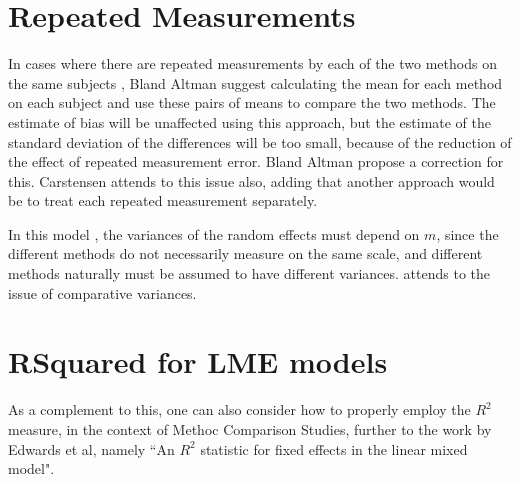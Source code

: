 \documentclass[12pt, a4paper]{report}
\theoremstyle{plain}
\theoremstyle{definition}
\theoremstyle{remark}
\begin{document}
	\section{Repeated Measurements}
	
	In cases where there are repeated measurements by each of the two
	methods on the same subjects , Bland Altman suggest calculating
	the mean for each method on each subject and use these pairs of
	means to compare the two methods.
	The estimate of bias will be unaffected using this approach, but
	the estimate of the standard deviation of the differences will be
	too small, because of the reduction of the effect of repeated
	measurement error. Bland Altman propose a correction for this.
	Carstensen attends to this issue also, adding that another
	approach would be to treat each repeated measurement separately.
	
	
	
	In this model , the variances of the random effects must depend on
	$m$, since the different methods do not necessarily measure on the
	same scale, and different methods naturally must be assumed to
	have different variances. \citet{BXC2004} attends to the issue of
	comparative variances.




	\section{RSquared for LME models}
	
	As a complement to this, one can also consider how to properly employ the $R^2$ measure, in the context of Methoc Comparison Studies, further to the work by Edwards et al, namely ``An $R^2$ statistic for fixed effects in the linear mixed model".
	
\end{document}
